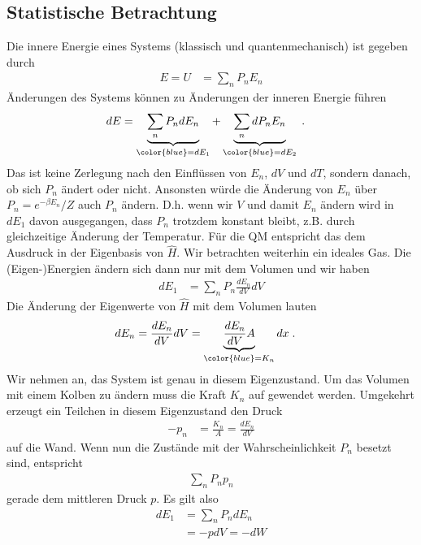 \subsection{Statistische  Betrachtung}

Die innere Energie eines	Systems (klassisch und quantenmechanisch) ist gegeben durch
\begin{align*}
E = U &=\sum_{n} P_{n} E_{n}
\end{align*}
Änderungen des Systems können zu Änderungen der inneren Energie führen
\begin{align*}
dE  &=\underbrace{
\sum_{n} P_{n} dE_{n}
}_{\color{blue} = dE_{1}} + \underbrace{
\sum_{n} d P_{n} E_{n}
}_{\color{blue} = dE_{2}}\;.
\end{align*} 
Das ist keine Zerlegung nach den Einflüssen von $E_{n}$, $dV$ und $dT$,
sondern danach, ob sich $P_{n}$ ändert oder nicht. Ansonsten würde die Änderung von $E_{n}$ über $P_{n} = e^{-\beta E_{n}}/Z$ auch $P_{n}$ ändern.
D.h. wenn wir $V$ und damit  $E_{n}$ ändern wird in $dE_{1}$ davon ausgegangen, dass 
$P_{n}$ trotzdem konstant bleibt, z.B. durch gleichzeitige Änderung der Temperatur.
Für die QM entspricht das dem Ausdruck in der Eigenbasis von $\hat H$.
Wir betrachten weiterhin ein ideales Gas. Die (Eigen-)Energien ändern sich dann nur mit dem Volumen und wir haben
\begin{align*}
dE_{1} &= \sum_{n} P_{n} \frac{d E_{n}}{dV }  dV
\end{align*}
Die Änderung der Eigenwerte von $\hat H$ mit  dem Volumen lauten
\begin{align*}
d E_{n} &= \frac{d E_{n}}{dV} dV  = \underbrace{
\frac{d E_{n}}{dV} A
}_{\color{blue} = K_{n}} dx \;.
\end{align*}
Wir nehmen an, das System ist genau in diesem Eigenzustand.
Um das Volumen mit einem Kolben zu ändern muss die Kraft $K_{n}$ auf gewendet werden.
Umgekehrt erzeugt ein Teilchen in diesem Eigenzustand den Druck
\begin{align*}
-p_{n} &= \frac{K_{n}}{A} = \frac{d E_{n}}{dV}
\end{align*}
auf die  Wand. Wenn nun die Zustände mit der Wahrscheinlichkeit $P_{n}$ besetzt sind, entspricht
\begin{align*}
\sum_{n} P_{n} p_{n} 
\end{align*}
gerade dem mittleren Druck $p$. Es gilt also
\begin{align*}
dE_{1} &= \sum _{n}P_{n} d E_{n} \\&= - p dV = -dW
\end{align*}

